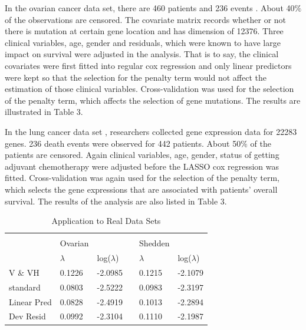 \par In the ovarian cancer data set, there are 460 patients and 236 events . About 40$\%$ of the observations are censored. The covariate matrix records whether or not there is mutation at certain gene location and has dimension of 12376. Three clinical variables, age, gender and residuals, which were known to have large impact on survival were adjusted in the analysis. That is to say, the clinical covariates were first fitted into regular cox regression and only linear predictors were kept so that the selection for the penalty term would not affect the estimation of those clinical variables. Cross-validation was used for the selection of the penalty term, which affects the selection of gene mutations. The results are illustrated in Table 3. 

\par In the lung cancer data set , researchers collected gene expression data for 22283 genes. 236 death events were observed for 442 patients. About 50$\%$ of the patients are censored. Again clinical variables, age, gender, status of getting adjuvant chemotherapy were adjusted before the LASSO cox regression was fitted. Cross-validation was again used for the selection of the penalty term, which selects the gene expressions that are associated with patients' overall survival. The results of the analysis are also listed in Table 3.

\begin{table}[h]
\centering
\caption{Application to Real Data Sets}
\label{my-label}
\begin{tabular}{llllll}
\hline
\\[-0.75em]
 & Ovarian & & & Shedden&  \\
& $\lambda$ & log($\lambda$) &  &$\lambda$  &  log($\lambda$)   \\ \cline{2-3} \cline{5-6} 
V $\&$ VH &0.1226 & -2.0985 && 0.1215 & -2.1079\\
standard & 0.0803 & -2.5222 && 0.0983 & -2.3197\\
Linear Pred &0.0828 & -2.4919 && 0.1013 & -2.2894\\
Dev Resid & 0.0992 & -2.3104 && 0.1110 & -2.1987\\ \hline
\end{tabular}
\end{table}

